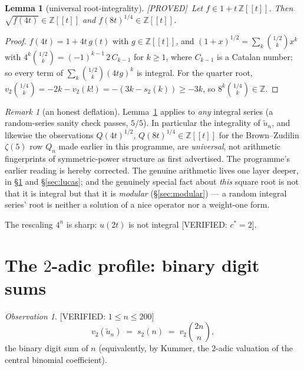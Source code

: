 \documentclass[11pt,reqno]{amsart}
\theoremstyle{plain}
\newtheorem{lemma}[theorem]{Lemma}
\theoremstyle{definition}
\theoremstyle{remark}
\newtheorem{remark}[theorem]{Remark}
\newtheorem{observation}[theorem]{Observation}
\newcommand{\Z}{\mathbb{Z}}
\newcommand{\bin}[2]{\binom{#1}{#2}}
\newcommand{\ut}{\tilde u}
\newcommand{\Proved}{\textup{\textsf{[PROVED]}}}
\newcommand{\VerifiedR}[1]{\textup{\textsf{[VERIFIED: #1]}}}
\begin{document}
\begin{lemma}[universal root-integrality]\label{lem:univ}
\Proved\
Let $f\in1+t\,\Z[[t]]$. Then $\sqrt{f(4t)}\in\Z[[t]]$ and
$f(8t)^{1/4}\in\Z[[t]]$.
\end{lemma}

\begin{proof}
$f(4t)=1+4t\,g(t)$ with $g\in\Z[[t]]$, and
$(1+x)^{1/2}=\sum_k\bin{1/2}{k}x^k$ with
$4^k\bin{1/2}{k}=(-1)^{k-1}\,2\,C_{k-1}$ for $k\ge1$, where $C_{k-1}$ is a
Catalan number; so every term of $\sum_k\bin{1/2}k(4tg)^k$ is integral.
For the quarter root, $v_2\bin{1/4}{k}=-2k-v_2(k!)=-(3k-s_2(k))\ge-3k$,
so $8^k\bin{1/4}k\in\Z$.
\end{proof}

\begin{remark}[an honest deflation]\label{rem:deflation}
Lemma~\ref{lem:univ} applies to \emph{any} integral series (a random-series
sanity check passes, $5/5$). In particular the integrality of $\ut_n$, and
likewise the observations
$Q(4t)^{1/2},\,Q(8t)^{1/4}\in\Z[[t]]$ for the Brown--Zudilin $\zeta(5)$
row $Q_n$ made earlier in this programme, are \emph{universal}, not
arithmetic fingerprints of symmetric-power structure as first advertised.
The programme's earlier reading is hereby corrected. The genuine
arithmetic lives one layer deeper, in \S\ref{sec:v2} and
\S\ref{sec:lucas}; and the genuinely special fact about \emph{this}
square root is not that it is integral but that it is \emph{modular}
(\S\ref{sec:modular}) --- a random integral series' root is neither a
solution of a nice operator nor a weight-one form.
\end{remark}

The rescaling $4^n$ is sharp: $u(2t)$ is not integral
\VerifiedR{$c^\ast=2$}.

\section{The $2$-adic profile: binary digit sums}\label{sec:v2}

\begin{observation}\label{obs:v2}
\VerifiedR{$1\le n\le200$}
\[
v_2(\ut_n)\;=\;s_2(n)\;=\;v_2\!\bin{2n}{n},
\]
the binary digit sum of $n$ (equivalently, by Kummer, the $2$-adic
valuation of the central binomial coefficient).
\end{observation}
\end{document}
